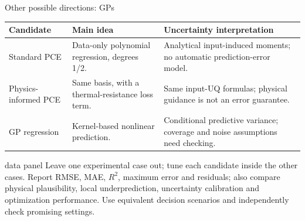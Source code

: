 \begin{frame}{Other possible directions: GPs}
  {\footnotesize
  \renewcommand{\arraystretch}{1.3}
  \begin{tabular}{@{}p{}p{}p{}@{}}
    \toprule
    \textbf{Candidate} & \textbf{Main idea} & \textbf{Uncertainty interpretation}\\
    \midrule
    Standard PCE & Data-only polynomial regression, degrees 1/2. & Analytical input-induced moments; no automatic prediction-error model.\\
    Physics-informed PCE & Same basis, with a thermal-resistance loss term. & Same input-UQ formulas; physical guidance is not an error guarantee.\\
    GP regression & Kernel-based nonlinear prediction. & Conditional predictive variance; coverage and noise assumptions need checking.\\
    \bottomrule
  \end{tabular}
  }
  \medskip
  \begin{beamercolorbox}[sep=2mm,wd=\textwidth]{data panel}
    \footnotesize
    Leave one experimental case out; tune each candidate inside the other cases.
    Report RMSE, MAE, $R^2$, maximum error and residuals; also compare physical
    plausibility, local underprediction, uncertainty calibration and optimization performance.
    Use equivalent decision scenarios and independently check promising settings.
  \end{beamercolorbox}
\end{frame}
